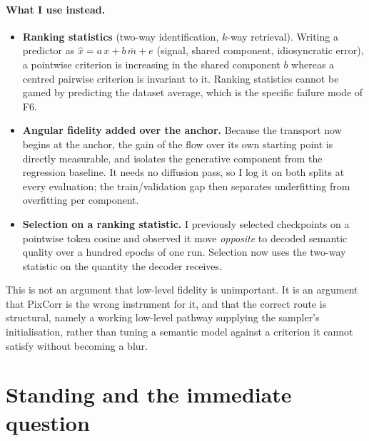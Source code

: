 \documentclass[11pt,a4paper]{article}
\theoremstyle{plain}
\theoremstyle{remark}
\begin{document}
\paragraph{What I use instead.}
\begin{itemize}
\item \textbf{Ranking statistics} (two-way identification, $k$-way retrieval).
      Writing a predictor as $\hat x = a\,x + b\,\bar m + e$ (signal, shared
      component, idiosyncratic error), a pointwise criterion is increasing in the
      shared component $b$ whereas a centred pairwise criterion is invariant to
      it. Ranking statistics cannot be gamed by predicting the dataset average,
      which is the specific failure mode of F6.
\item \textbf{Angular fidelity added over the anchor.} Because the transport now
      begins at the anchor, the gain of the flow over its own starting point is
      directly measurable, and isolates the generative component from the
      regression baseline. It needs no diffusion pass, so I log it on both splits
      at every evaluation; the train/validation gap then separates underfitting
      from overfitting per component.
\item \textbf{Selection on a ranking statistic.} I previously selected
      checkpoints on a pointwise token cosine and observed it move \emph{opposite}
      to decoded semantic quality over a hundred epochs of one run. Selection now
      uses the two-way statistic on the quantity the decoder receives.
\end{itemize}

\noindent
This is not an argument that low-level fidelity is unimportant. It is an argument
that PixCorr is the wrong instrument for it, and that the correct route is
structural, namely a working low-level pathway supplying the sampler's
initialisation, rather than tuning a semantic model against a criterion it cannot
satisfy without becoming a blur.

\section{Standing and the immediate question}
\label{sec:open}
\end{document}
